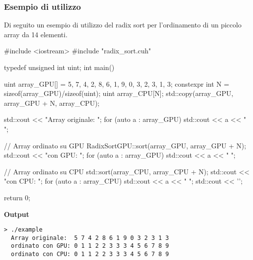 \subsubsection{Esempio di utilizzo}
Di seguito un esempio di utilizzo del radix sort per l'ordinamento di un piccolo array da 14 elementi.
\begin{cpp}[caption={%
		Esempio di funzionamento dell'implementazione del radix-sort per ordinare un array utilizzando la GPU.
		L'array in input \texttt{array\_GPU} si trova sull'host ha dimensione 14 ed è stato copiato in \texttt{array\_CPU} per la verifica di correttezza su CPU.
		\\
		L'interfaccia ed il funzionamento di \texttt{RadixSortGPU::sort(*)} è simile a \texttt{std::sort(*)} della STD del C++.
	},%
 label={example-code}, captionpos=t]
#include <iostream>
#include "radix_sort.cuh"

typedef unsigned int uint;
int main(){
	uint array_GPU[] = {5, 7, 4, 2, 8, 6, 1, 9, 0, 3, 2, 3, 1, 3}; 
	constexpr int N = sizeof(array_GPU)/sizeof(uint);
	uint array_CPU[N];
	std::copy(array_GPU, array_GPU + N, array_CPU);
	
	std::cout << "Array originale:  ";
	for (auto a : array_GPU) std::cout << a << " ";
	
	// Array ordinato su GPU
	RadixSortGPU::sort(array_GPU, array_GPU + N);    
	std::cout << "\nordinato con GPU: ";
	for (auto a : array_GPU) std::cout << a << " ";
	
	// Array ordinato su CPU
	std::sort(array_CPU, array_CPU + N);             
	std::cout << "\nordinato con CPU: ";
	for (auto a : array_CPU) std::cout << a << " ";
	std::cout << '\n';
	
	return 0;
}
\end{cpp}

\bigskip
\textbf{Output}
\begin{lstlisting}[style=console, caption={Output dell'esempio. Come è possibile vedere l'output dell'algoritmo su CPU coincide con quello prodotto sulla GPU.}, label={execution}]
> ./example
  Array originale:  5 7 4 2 8 6 1 9 0 3 2 3 1 3
  ordinato con GPU: 0 1 1 2 2 3 3 3 4 5 6 7 8 9
  ordinato con CPU: 0 1 1 2 2 3 3 3 4 5 6 7 8 9
\end{lstlisting}


